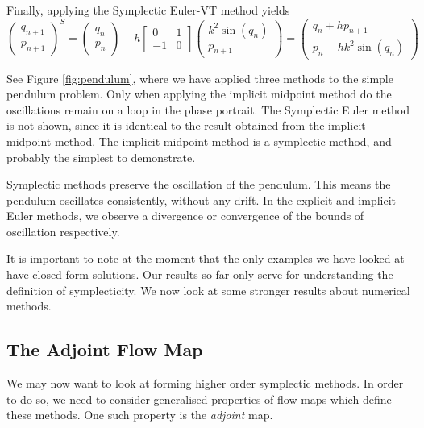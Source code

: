 Finally, applying the Symplectic Euler-VT method yields
\begin{equation}
	\begin{pmatrix}
		q_{n+1} \\
		p_{n+1}
	\end{pmatrix}^S = \begin{pmatrix}
		q_n \\
		p_n
	\end{pmatrix} + h \begin{bmatrix}
		0 & 1 \\
		-1 & 0
	\end{bmatrix} \begin{pmatrix}
		k^2 \sin(q_n) \\
		p_{n+1}
	\end{pmatrix} = \begin{pmatrix}
		q_n + h p_{n+1} \\
		p_n - h k^2 \sin(q_n)
	\end{pmatrix}
\end{equation}

See Figure \ref{fig:pendulum}, where we have applied three methods to the simple pendulum problem.
Only when applying the implicit midpoint method do the oscillations remain on a loop in the phase portrait.
The Symplectic Euler method is not shown, since it is identical to the result obtained from the implicit midpoint method.
The implicit midpoint method is a symplectic method, and probably the simplest to demonstrate.

Symplectic methods preserve the oscillation of the pendulum.
This means the pendulum oscillates consistently, without any drift.
In the explicit and implicit Euler methods, we observe a divergence or convergence of the bounds of oscillation respectively.

It is important to note at the moment that the only examples we have looked at have closed form solutions.
Our results so far only serve for understanding the definition of symplecticity.
We now look at some stronger results about numerical methods.

\subsection{The Adjoint Flow Map}

We may now want to look at forming higher order symplectic methods. In order to do so, we need to consider generalised properties of flow maps which define these methods.
One such property is the \textit{adjoint} map.

